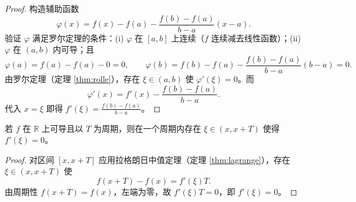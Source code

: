 \begin{proof}
构造辅助函数
\[
\varphi(x) = f(x) - f(a) - \frac{f(b)-f(a)}{b-a}(x-a).
\]
验证 $\varphi$ 满足罗尔定理的条件：(i) $\varphi$ 在 $[a,b]$ 上连续（$f$ 连续减去线性函数）；(ii) $\varphi$ 在 $(a,b)$ 内可导；且
\[
\varphi(a) = f(a) - f(a) - 0 = 0, \qquad
\varphi(b) = f(b) - f(a) - \frac{f(b)-f(a)}{b-a}(b-a) = 0.
\]
由罗尔定理（定理 \ref{thm:rolle}），存在 $\xi \in (a,b)$ 使 $\varphi'(\xi) = 0$。而
\[
\varphi'(x) = f'(x) - \frac{f(b)-f(a)}{b-a}.
\]
代入 $x = \xi$ 即得 $f'(\xi) = \frac{f(b)-f(a)}{b-a}$。
\end{proof}

\begin{corollary}[周期函数的中值性质]\label{cor:periodic_mean_value}
若 $f$ 在 $\mathbb{R}$ 上可导且以 $T$ 为周期，则在一个周期内存在 $\xi \in (x, x+T)$ 使得 $f'(\xi) = 0$。
\end{corollary}

\begin{proof}
对区间 $[x, x+T]$ 应用拉格朗日中值定理（定理 \ref{thm:lagrange}），存在 $\xi \in (x, x+T)$ 使
\[
f(x+T) - f(x) = f'(\xi)T.
\]
由周期性 $f(x+T) = f(x)$，左端为零，故 $f'(\xi)T = 0$，即 $f'(\xi) = 0$。
\end{proof}

